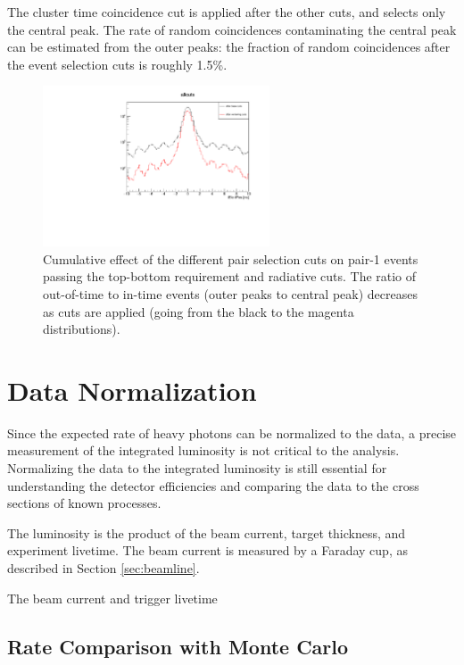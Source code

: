 The cluster time coincidence cut is applied after the other cuts, and selects only the central peak.
The rate of random coincidences contaminating the central peak can be estimated from the outer peaks: the fraction of random coincidences after the event selection cuts is roughly 1.5\%.

\begin{figure}[ht]
\begin{center}
    \includegraphics[width=0.6\textwidth,page=2,angle=-90]{recon/figs/basecutplots}
\end{center}
    \caption{Cumulative effect of the different pair selection cuts on pair-1 events passing the top-bottom requirement and radiative cuts.
    The ratio of out-of-time to in-time events (outer peaks to central peak) decreases as cuts are applied (going from the black to the magenta distributions).
    }
    \label{fig:basecut_performance}
\end{figure}

\section{Data Normalization}
\label{sec:luminosity}
Since the expected rate of heavy photons can be normalized to the data, a precise measurement of the integrated luminosity is not critical to the analysis.
Normalizing the data to the integrated luminosity is still essential for understanding the detector efficiencies and comparing the data to the cross sections of known processes.

The luminosity is the product of the beam current, target thickness, and experiment livetime.
The beam current is measured by a Faraday cup, as described in Section \ref{sec:beamline}.

\begin{equation}
\end{equation}
The beam current and trigger livetime

\subsection{Rate Comparison with Monte Carlo}
\label{sec:rates}